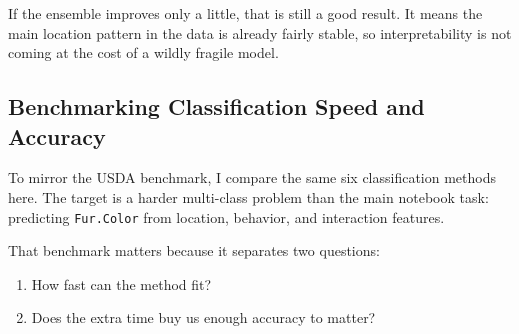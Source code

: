 \documentclass[
  11pt,
]{article}
\providecommand{\tightlist}{%
  \setlength{\itemsep}{0pt}\setlength{\parskip}{0pt}}
\begin{document}
If the ensemble improves only a little, that is still a good result. It
means the main location pattern in the data is already fairly stable, so
interpretability is not coming at the cost of a wildly fragile model.

\subsection{Benchmarking Classification Speed and
Accuracy}\label{benchmarking-classification-speed-and-accuracy}

To mirror the USDA benchmark, I compare the same six classification
methods here. The target is a harder multi-class problem than the main
notebook task: predicting \texttt{Fur.Color} from location, behavior,
and interaction features.

That benchmark matters because it separates two questions:

\begin{enumerate}
\def\labelenumi{\arabic{enumi}.}
\tightlist
\item
  How fast can the method fit?
\item
  Does the extra time buy us enough accuracy to matter?
\end{enumerate}
\end{document}
